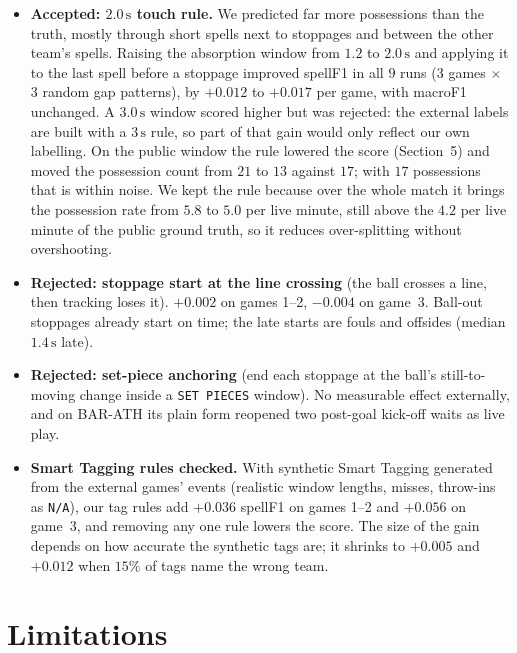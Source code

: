 \documentclass[11pt,a4paper]{article}
\newcommand{\code}[1]{\texttt{#1}}
\begin{document}
\begin{itemize}
  \item \textbf{Accepted: $2.0\,\text{s}$ touch rule.} We predicted far more possessions than
        the truth, mostly through short spells next to stoppages and between the other team's
        spells. Raising the absorption window from $1.2$ to $2.0\,\text{s}$ and applying it to the
        last spell before a stoppage improved spellF1 in all $9$ runs ($3$ games $\times$ $3$
        random gap patterns), by $+0.012$ to $+0.017$ per game, with macroF1 unchanged. A
        $3.0\,\text{s}$ window scored higher but was rejected: the external labels are built with a
        $3\,\text{s}$ rule, so part of that gain would only reflect our own labelling. On the
        public window the rule lowered the score (Section~5) and moved the possession count from
        $21$ to $13$ against $17$; with $17$ possessions that is within noise. We kept the rule
        because over the whole match it brings the possession rate from $5.8$ to $5.0$ per live
        minute, still above the $4.2$ per live minute of the public ground truth, so it reduces
        over-splitting without overshooting.
  \item \textbf{Rejected: stoppage start at the line crossing} (the ball crosses a line, then
        tracking loses it). $+0.002$ on games 1--2, $-0.004$ on game~3. Ball-out stoppages already
        start on time; the late starts are fouls and offsides (median $1.4\,\text{s}$ late).
  \item \textbf{Rejected: set-piece anchoring} (end each stoppage at the ball's still-to-moving
        change inside a \code{SET PIECES} window). No measurable effect externally, and on BAR-ATH
        its plain form reopened two post-goal kick-off waits as live play.
  \item \textbf{Smart Tagging rules checked.} With synthetic Smart Tagging generated from the
        external games' events (realistic window lengths, misses, throw-ins as \code{N/A}), our
        tag rules add $+0.036$ spellF1 on games 1--2 and $+0.056$ on game~3, and removing any one
        rule lowers the score. The size of the gain depends on how accurate the synthetic tags
        are; it shrinks to $+0.005$ and $+0.012$ when $15\%$ of tags name the wrong team.
\end{itemize}

\section{Limitations}
\end{document}
